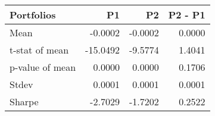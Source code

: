 \begin{tabular}{lrrr}
\toprule
Portfolios & P1 & P2 & P2 - P1 \\
\midrule
Mean & -0.0002 & -0.0002 & 0.0000 \\
t-stat of mean & -15.0492 & -9.5774 & 1.4041 \\
p-value of mean & 0.0000 & 0.0000 & 0.1706 \\
Stdev & 0.0001 & 0.0001 & 0.0001 \\
Sharpe & -2.7029 & -1.7202 & 0.2522 \\
\bottomrule
\end{tabular}
